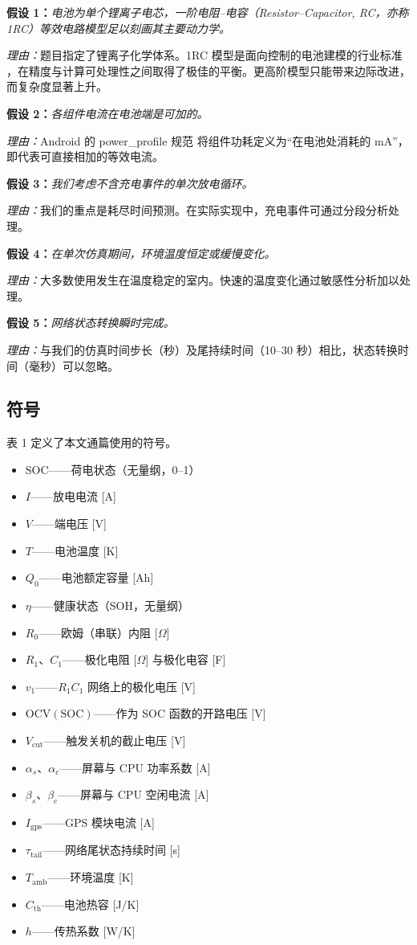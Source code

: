 \documentclass[11pt,a4paper]{ctexart}
\begin{document}
\textbf{假设 1：}\textit{电池为单个锂离子电芯，一阶电阻--电容（Resistor--Capacitor, RC，亦称 1RC）等效电路模型足以刻画其主要动力学。}

\textit{理由：}题目指定了锂离子化学体系。1RC 模型是面向控制的电池建模的行业标准 \cite{ref12,ref13}，在精度与计算可处理性之间取得了极佳的平衡。更高阶模型只能带来边际改进，而复杂度显著上升。

\textbf{假设 2：}\textit{各组件电流在电池端是可加的。}

\textit{理由：}Android 的 power\_profile 规范 \cite{ref5} 将组件功耗定义为“在电池处消耗的 mA”，即代表可直接相加的等效电流。

\textbf{假设 3：}\textit{我们考虑不含充电事件的单次放电循环。}

\textit{理由：}我们的重点是耗尽时间预测。在实际实现中，充电事件可通过分段分析处理。

\textbf{假设 4：}\textit{在单次仿真期间，环境温度恒定或缓慢变化。}

\textit{理由：}大多数使用发生在温度稳定的室内。快速的温度变化通过敏感性分析加以处理。

\textbf{假设 5：}\textit{网络状态转换瞬时完成。}

\textit{理由：}与我们的仿真时间步长（秒）及尾持续时间（10--30 秒）相比，状态转换时间（毫秒）可以忽略。

\subsection{符号}

表 1 定义了本文通篇使用的符号。

{\small
\begin{itemize}[leftmargin=1.6em,itemsep=0pt,topsep=0.2em,parsep=0pt]
\item $\mathrm{SOC}$——荷电状态（无量纲，0--1）
\item $I$——放电电流 [A]
\item $V$——端电压 [V]
\item $T$——电池温度 [K]
\item $Q_0$——电池额定容量 [Ah]
\item $\eta$——健康状态（SOH，无量纲）
\item $R_0$——欧姆（串联）内阻 [$\Omega$]
\item $R_1$、$C_1$——极化电阻 [$\Omega$] 与极化电容 [F]
\item $v_1$——$R_1 C_1$ 网络上的极化电压 [V]
\item $\mathrm{OCV}(\mathrm{SOC})$——作为 SOC 函数的开路电压 [V]
\item $V_{\mathrm{cut}}$——触发关机的截止电压 [V]
\item $\alpha_s$、$\alpha_c$——屏幕与 CPU 功率系数 [A]
\item $\beta_s$、$\beta_c$——屏幕与 CPU 空闲电流 [A]
\item $I_{\mathrm{gps}}$——GPS 模块电流 [A]
\item $\tau_{\mathrm{tail}}$——网络尾状态持续时间 [s]
\item $T_{\mathrm{amb}}$——环境温度 [K]
\item $C_{\mathrm{th}}$——电池热容 [J/K]
\item $h$——传热系数 [W/K]
\end{itemize}
}
\end{document}
